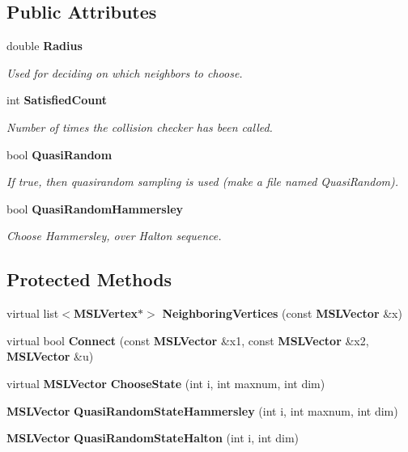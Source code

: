 \subsection*{Public Attributes}
\begin{CompactItemize}
\item 
double {\bf Radius}
\begin{CompactList}\small\item\em Used for deciding on which neighbors to choose.\item\end{CompactList}\item 
int {\bf Satisfied\-Count}
\begin{CompactList}\small\item\em Number of times the collision checker has been called.\item\end{CompactList}\item 
bool {\bf Quasi\-Random}
\begin{CompactList}\small\item\em If true, then quasirandom sampling is used (make a file named Quasi\-Random).\item\end{CompactList}\item 
bool {\bf Quasi\-Random\-Hammersley}
\begin{CompactList}\small\item\em Choose Hammersley, over Halton sequence.\item\end{CompactList}\end{CompactItemize}
\subsection*{Protected Methods}
\begin{CompactItemize}
\item 
virtual list$<${\bf MSLVertex}$\ast$$>$ {\bf Neighboring\-Vertices} (const {\bf MSLVector} \&x)
\item 
virtual bool {\bf Connect} (const {\bf MSLVector} \&x1, const {\bf MSLVector} \&x2, {\bf MSLVector} \&u)
\item 
virtual {\bf MSLVector} {\bf Choose\-State} (int i, int maxnum, int dim)
\item 
{\bf MSLVector} {\bf Quasi\-Random\-State\-Hammersley} (int i, int maxnum, int dim)
\item 
{\bf MSLVector} {\bf Quasi\-Random\-State\-Halton} (int i, int dim)
\end{CompactItemize}
